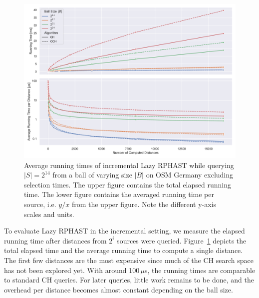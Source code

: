 \documentclass[manuscript]{acmart}
\begin{document}
\begin{figure}
\centering
\includegraphics[width=\linewidth]{fig/lazy_rphast_inc.pdf}
\caption{
Average running times of incremental Lazy RPHAST while querying $|S| = 2^{14}$ from a ball of varying size $|B|$ on OSM Germany excluding selection times.
The upper figure contains the total elapsed running time.
The lower figure contains the averaged running time per source, i.e. $y/x$ from the upper figure.
Note the different y-axis scales and units.
}\label{fig:lazy_rphast_inc}
\end{figure}

To evaluate Lazy RPHAST in the incremental setting, we measure the elapsed running time after distances from $2^i$ sources were queried.
Figure~\ref{fig:lazy_rphast_inc} depicts the total elapsed time and the average running time to compute a single distance.
The first few distances are the most expensive since much of the CH search space has not been explored yet.
With around 100\,$\mu$s, the running times are comparable to standard CH queries.
For later queries, little work remains to be done, and the overhead per distance becomes almost constant depending on the ball size.
\end{document}
